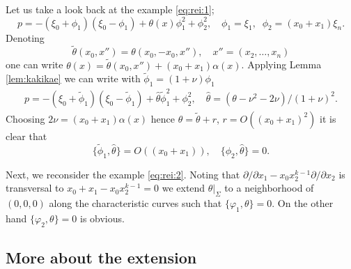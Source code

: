 \documentclass[12pt,leqno]{article} %
\def\dif{\partial}
\def\al{\alpha}
\numberwithin{equation}{section}
\begin{document}
%
Let us take a look back at  the example \eqref{eq:rei:1};
%
\[
p=-(\xi_0+\phi_1)(\xi_0-\phi_1)+\theta(x)\phi_1^2+\phi_2^2,\quad \phi_1=\xi_1,\;\;\phi_2=(x_0+x_1)\xi_n.
\]
%
Denoting
%
\[
\tilde\theta(x_0, x'')=\theta(x_0,-x_0,x''),\quad x''=(x_2,\ldots,x_n)
\]
%
one can write $\theta(x)=\tilde \theta(x_0,x'')+(x_0+x_1)\al(x)$. Applying Lemma \ref{lem:kakikae}
we can write with $\tilde\phi_1=(1+\nu)\phi_1$ 
%
\begin{gather*}
p=-(\xi_0+\tilde\phi_1)(\xi_0-\tilde\phi_1)+\hat\theta\tilde\phi_1^2+\phi_2^2,\quad \hat\theta=(\theta-\nu^2-2\nu)/(1+\nu)^2.
\end{gather*}
%
Choosing $2\nu=(x_0+x_1)\al(x)$ hence $
\hat\theta=\tilde\theta+r$, $r=O((x_0+x_1)^2)$  it is clear that 
%
\[
\{\tilde\phi_1,\hat\theta\}=O((x_0+x_1)),\quad \{\phi_2, \hat\theta\}= 0.
\]
%
%

Next, we reconsider the example \eqref{eq:rei:2}. Noting that $\dif/\dif x_1-x_0x_2^{k-1}\dif/\dif x_2$ is transversal to $x_0+x_1-x_0x_2^{k-1}=0$ we extend $\theta|_{\Sigma}$ to a neighborhood of $(0,0,0)$ along the characteristic curves such that $\{\varphi_1,\theta\}=0$. On the other hand $\{\varphi_2,\theta\}=0$ is obvious.






























\subsection{More about the extension}
\end{document}
